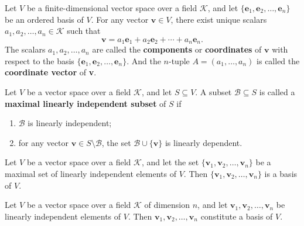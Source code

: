 \begin{definitionenv}
	Let $V$ be a finite-dimensional vector space over a field $\mathcal{K}$, and let
	$\{\bm{e}_1, \bm{e}_2, \dots, \bm{e}_n\}$ be an ordered basis of $V$.
	For any vector $\bm{v} \in V$, there exist unique scalars
	$a_1, a_2, \dots, a_n \in \mathcal{K}$ such that
	\[
	\bm{v} = a_1 \bm{e}_1 + a_2 \bm{e}_2 + \cdots + a_n \bm{e}_n.
	\]
	The scalars $a_1, a_2, \dots, a_n$ are called the \textbf{components} or \textbf{coordinates} of $\bm{v}$
	with respect to the basis $\{\bm{e}_1, \bm{e}_2, \dots, \bm{e}_n\}$. And the $n$-tuple $A=(a_1,\dots,a_n)$ is called the \textbf{coordinate vector} of \textbf{v}.
\end{definitionenv}

\begin{definitionenv}
	Let $V$ be a vector space over a field $\mathcal{K}$, and let
	$S \subseteq V$.
	A subset $\mathcal{B} \subseteq S$ is called a \textbf{maximal linearly independent subset} of $S$ if
	\begin{enumerate}
		\item $\mathcal{B}$ is linearly independent;
		\item for any vector $\bm{v} \in S \setminus \mathcal{B}$, the set
		$\mathcal{B} \cup \{\bm{v}\}$ is linearly dependent.
	\end{enumerate}
\end{definitionenv}

\begin{theoremenv}
	Let $V$ be a vector space over a field $\mathcal{K}$, and let the set
	$\{\bm{v}_1, \bm{v}_2, \dots, \bm{v}_n\}$ be a maximal set of linearly independent elements of $V$.
	Then $\{\bm{v}_1, \bm{v}_2, \dots, \bm{v}_n\}$ is a basis of $V$.
\end{theoremenv}


\begin{theoremenv}
	Let $V$ be a vector space over a field $\mathcal{K}$ of dimension $n$, and let
	$\bm{v}_1, \bm{v}_2, \dots, \bm{v}_n$ be linearly independent elements of $V$.
	Then $\bm{v}_1, \bm{v}_2, \dots, \bm{v}_n$ constitute a basis of $V$.
\end{theoremenv}

